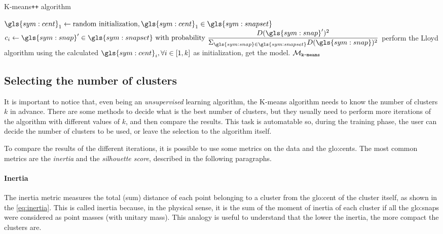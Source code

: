 \begin{algorithm}
  \caption{K-means\texttt{++} algorithm}
  \label{alg:kmeanspp}
\begin{algorithmic}[1]
  \State $\gls{sym:cent}_1 \gets \text{random initialization}, \gls{sym:cent}_1 \in \gls{sym:snapset}$
  \State $c_i \gets \gls{sym:snap}' \in \gls{sym:snapset} \text{ with probability } \dfrac{D(\gls{sym:snap}')^2}{\Sigma_{\gls{sym:snap}\in\gls{sym:snapset}}D(\gls{sym:snap})^2}$
  \EndFor
  \State perform the Lloyd algorithm using the calculated $\gls{sym:cent}_i, \forall i \in [1,k]$ as initialization, get the model.
  \State \Return $\mathcal{M}_{\text{\texttt{k-means}}}$  
  \EndFunction
\end{algorithmic}
\end{algorithm}

\subsection{Selecting the number of clusters}
It is important to notice that, even being an \emph{unsupervised} learning algorithm, the K-means algorithm needs to know the number of clusters $k$ in advance. There are some methods to decide what is the best number of clusters, but they usually need to perform more iterations of the algorithm with different values of $k$, and then compare the results. This task is automatable so, during the training phase, the user can decide the number of clusters to be used, or leave the selection to the algorithm itself.

To compare the results of the different iterations, it is possible to use some metrics on the data and the {\gls{glo:cent}}s. The most common metrics are the \emph{inertia} and the \emph{silhouette score}, described in the following paragraphs.

\paragraph*{Inertia}
The inertia metric measures the total (sum) distance of each point belonging to a cluster from the {\gls{glo:cent}} of the cluster itself, as shown in the \autoref{eq:inertia}. This is called inertia because, in the physical sense, it is the sum of the moment of inertia of each cluster if all the {\gls{glo:snap}}s were considered as point masses (with unitary mass). This analogy is useful to understand that the lower the inertia, the more compact the clusters are.

